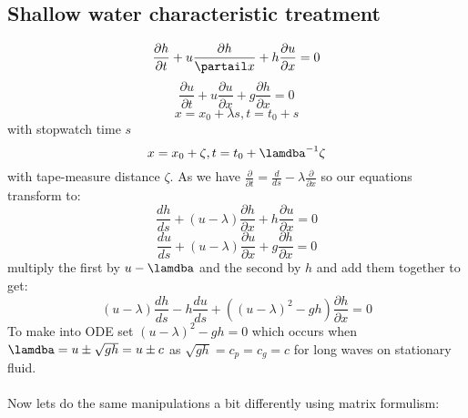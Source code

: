 \documentclass{article}
\begin{document}
 \subsection{Shallow water characteristic treatment}
 $$
  \frac{\partial h}{\partial t} + u \frac{\partial h}{\partail x} + h \frac{\partial u}{\partial x} = 0
 $$
 $$
  \frac{\partial u}{\partial t} + u \frac{\partial u}{\partial x} + g \frac{\partial h}{\partial x} =0
 $$
 $$
 x = x_0 + \lambda s, t = t_0 + s
 $$
 with stopwatch time $s$
 $$
  x= x_0 + \zeta, t = t_0 + \lamdba^{-1} \zeta
 $$
 with tape-measure distance $\zeta$.
 As we have $\frac{\partial}{\partial t} = \frac{d}{ds} - \lambda \frac{\partial }{\partial x}$ so our equations transform to:
 $$
  \frac{dh}{ds} + ( u - \lambda) \frac{\partial h}{\partial x} + h \frac{\partial u}{\partial x} = 0
 $$
 $$
  \frac{du}{ds} + (u- \lambda) \frac{\partial u}{\partial x} + g \frac{\partial h}{\partial x} = 0
 $$
 multiply the first by $u - \lamdba$ and the second by $h$ and add them together to get:
 $$
 (u-\lambda) \frac{dh}{ds} - h \frac{du}{ds} + ( (u- \lambda)^2 - gh) \frac{\partial h}{\partial x} = 0
 $$
 To make into ODE set $(u- \lambda)^2 - gh = 0$ which occurs when $\lamdba = u \pm \sqrt{gh} = u \pm c$ as $\sqrt{gh} = c_p = c_g = c$ for long waves on stationary fluid.\\\\
 Now lets do the same manipulations a bit differently using matrix formulism:
\end{document}
